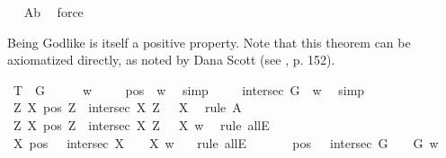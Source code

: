 \begin{isabellebody}
\ %
%
\isamarkupfalse%
\ A{}b\ \isamarkupfalse%
\ force%
%
%
%
\begin{isamarkuptext}%
Being Godlike is itself a positive property. Note that this theorem can be axiomatized directly,
as noted by Dana Scott (see \cite{Fitting}, p. 152).%
\end{isamarkuptext}\isamarkuptrue%
\isamarkupfalse%
\ T{}{\isacharcolon}\ {\isachardoublequoteopen}{\isasymlfloor}{\isasymP}\ G{\isasymrfloor}{\isachardoublequoteclose}\isanewline
%
%
%
\isamarkupfalse%
\ {\isacharminus}\isanewline
\isacommand{{\isacharbraceleft}}\isamarkupfalse%
\isanewline
\ \ \isamarkupfalse%
\ w\isanewline
\ \ \isamarkupfalse%
\ {}{\isacharcolon}\ {\isachardoublequoteopen}pos\ {\isasymP}\ w{\isachardoublequoteclose}\ \isamarkupfalse%
\ simp\isanewline
\ \ \isamarkupfalse%
\ {}{\isacharcolon}\ {\isachardoublequoteopen}intersec\ G\ {\isasymP}\ w{\isachardoublequoteclose}\ \isamarkupfalse%
\ simp\isanewline
\ \ \isamarkupfalse%
\ {\isachardoublequoteopen}{\isasymlfloor}\isactrlbold {\isasymforall}Z\ X{\isachardot}\ {\isacharparenleft}pos\ Z\ \isactrlbold {\isasymand}\ intersec\ X\ Z{\isacharparenright}\ \isactrlbold {\isasymrightarrow}\ {\isasymP}\ X{\isasymrfloor}{\isachardoublequoteclose}\ \isamarkupfalse%
\ {\isacharparenleft}rule\ A{}{\isacharparenright}\isanewline
\ \ \isamarkupfalse%
\ {\isachardoublequoteopen}{\isacharparenleft}\isactrlbold {\isasymforall}Z\ X{\isachardot}\ {\isacharparenleft}pos\ Z\ \isactrlbold {\isasymand}\ intersec\ X\ Z{\isacharparenright}\ \isactrlbold {\isasymrightarrow}\ {\isasymP}\ X{\isacharparenright}\ w{\isachardoublequoteclose}\ \isamarkupfalse%
\ {\isacharparenleft}rule\ allE{\isacharparenright}\isanewline
\ \ \isamarkupfalse%
\ {\isachardoublequoteopen}{\isacharparenleft}\isactrlbold {\isasymforall}X{\isachardot}\ {\isacharparenleft}{\isacharparenleft}pos\ {\isasymP}{\isacharparenright}\ \isactrlbold {\isasymand}\ {\isacharparenleft}intersec\ X\ {\isasymP}{\isacharparenright}{\isacharparenright}\ \isactrlbold {\isasymrightarrow}\ {\isasymP}\ X{\isacharparenright}\ w{\isachardoublequoteclose}\ \ \isamarkupfalse%
\ {\isacharparenleft}rule\ allE{\isacharparenright}\ \ \ \isanewline
\ \ \isamarkupfalse%
\ {\isachardoublequoteopen}{\isacharparenleft}{\isacharparenleft}{\isacharparenleft}pos\ {\isasymP}{\isacharparenright}\ \isactrlbold {\isasymand}\ {\isacharparenleft}intersec\ G\ {\isasymP}{\isacharparenright}{\isacharparenright}\ \isactrlbold {\isasymrightarrow}\ {\isasymP}\ G{\isacharparenright}\ w{\isachardoublequoteclose}\ \isamarkupfalse%

\end{isabellebody}
